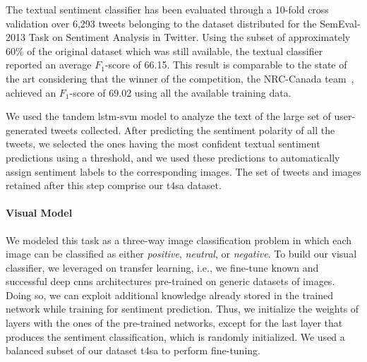 The textual sentiment classifier has been evaluated through a 10-fold cross validation over 6,293 tweets belonging to the dataset distributed for the SemEval-2013 Task on Sentiment Analysis in Twitter.
Using the subset of approximately 60\% of the original dataset which was still available, the textual classifier reported an average $F_1$-score of 66.15.
This result is comparable to the state of the art considering that the winner of the competition, the NRC-Canada team~\cite{mohammad2013nrc}, achieved an $F_1$-score of 69.02 using all the available training data.

We used the tandem \gls{lstm}-\gls{svm} model to analyze the text of the large set of user-generated tweets collected.
After predicting the sentiment polarity of all the tweets, we selected the ones having the most confident textual sentiment predictions using a threshold, and we used these predictions to automatically assign sentiment labels to the corresponding images.
The set of tweets and images retained after this step comprise our \gls{t4sa} dataset.

\paragraph{Visual Model}
We modeled this task as a three-way image classification problem in which each image can be classified as either \emph{positive}, \emph{neutral}, or \emph{negative}.
To build our visual classifier, we leveraged on transfer learning, i.e., we fine-tune known and successful deep \glspl{cnn} architectures pre-trained on generic datasets of images.
Doing so, we can exploit additional knowledge already stored in the trained network while training for sentiment prediction.
Thus, we initialize the weights of layers with the ones of the pre-trained networks, except for the last layer that produces the sentiment classification, which is randomly initialized.
We used a balanced subset of our dataset \gls{t4sa} to perform fine-tuning.

